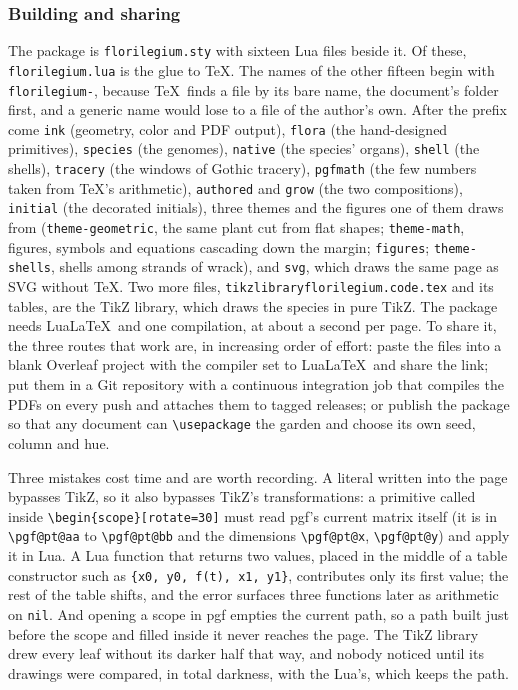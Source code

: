\subsubsection{Building and sharing}

The package is \texttt{florilegium.sty} with sixteen Lua files beside it. Of these,
\texttt{florilegium.lua} is the glue to \TeX. The names of the other fifteen begin with
\texttt{florilegium-}, because \TeX\ finds a file by its bare name, the document's folder
first, and a generic name would lose to a file of the author's own. After the prefix come
\texttt{ink} (geometry, color and PDF output), \texttt{flora} (the hand-designed primitives),
\texttt{species} (the genomes), \texttt{native} (the species' organs), \texttt{shell} (the
shells), \texttt{tracery} (the windows of Gothic tracery), \texttt{pgfmath} (the few numbers
taken from \TeX's arithmetic), \texttt{authored} and \texttt{grow} (the two compositions),
\texttt{initial} (the decorated initials), three themes and the figures one of them draws from
(\texttt{theme-geometric}, the same plant cut from flat shapes; \texttt{theme-math}, figures,
symbols and equations cascading down the margin; \texttt{figures}; \texttt{theme-shells},
shells among strands of wrack), and \texttt{svg}, which draws the same page as SVG without \TeX. Two more
files, \texttt{tikzlibraryflorilegium.code.tex} and its tables,
are the TikZ library, which draws the species in pure TikZ. The package needs Lua\LaTeX\ and
one compilation, at about a second per page. To share it, the three routes that work are, in
increasing order of effort: paste the files into a blank Overleaf project with the compiler set
to Lua\LaTeX\ and share the link; put them in a Git repository with a continuous integration
job that compiles the PDFs on every push and attaches them to tagged releases; or publish the
package so that any document can \texttt{\textbackslash usepackage} the garden and choose its
own seed, column and hue.

\begin{remark}
Three mistakes cost time and are worth recording. A literal written into the page bypasses
TikZ, so it also bypasses TikZ's transformations: a primitive called inside
\verb|\begin{scope}[rotate=30]| must read pgf's current matrix itself (it is in
\verb|\pgf@pt@aa| to \verb|\pgf@pt@bb| and the dimensions \verb|\pgf@pt@x|,
\verb|\pgf@pt@y|) and apply it in Lua. A Lua function that returns two values, placed
in the middle of a table constructor such as \verb|{x0, y0, f(t), x1, y1}|, contributes only
its first value; the rest of the table shifts, and the error surfaces three functions
later as arithmetic on \texttt{nil}. And opening a scope in pgf empties the current path, so a
path built just before the scope and filled inside it never reaches the page. The TikZ library
drew every leaf without its darker half that way, and nobody noticed until its drawings were
compared, in total darkness, with the Lua's, which keeps the path.
\end{remark}
